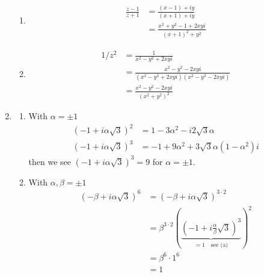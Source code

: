 \documentclass[10pt,a4paper]{book}
\theoremstyle{definition}
\begin{document}
\begin{enumerate}
\begin{enumerate}
\item\begin{align}
\frac{z-1}{z+1}
&=\frac{(x-1)+iy}{(x+1)+iy}\\
&=\frac{x^2+y^2-1+2xyi}{(x+1)^2+y^2}
\end{align}

\item\begin{align}
1/z^2&=\frac{1}{x^2-y^2+2xyi}\\
&=\frac{x^2-y^2-2xyi}{(x^2-y^2+2xyi)(x^2-y^2-2xyi)}\\
&=\frac{x^2-y^2-2xyi}{(x^2+y^2)^2}
\end{align}
\end{enumerate}
\item\begin{enumerate}
\item With $\alpha=\pm1$
\begin{align}
(-1+i\alpha\sqrt{3})^2
&=1-3\alpha^2-i2\sqrt{3}\alpha\\
(-1+i\alpha\sqrt{3})^3
&=-1+9\alpha^2+3\sqrt{3}\alpha(1-\alpha^2)i
\end{align}
then we see $(-1+i\alpha\sqrt{3})^3=9$ for $\alpha=\pm1$.

\item With $\alpha,\beta=\pm1$
\begin{align}
(-\beta+i\alpha\sqrt{3})^6&=(-\beta+i\alpha\sqrt{3})^{3\cdot2}\\
&=\beta^{3\cdot2}\left(\underbrace{\left(-1+i\frac{\alpha}{\beta}\sqrt{3}\right)^3}_{=1\quad\text{see (a)}}\right)^2\\
&=\beta^6\cdot 1^{6}\\
&=1
\end{align}
\end{enumerate}
\end{enumerate}
\end{document}
